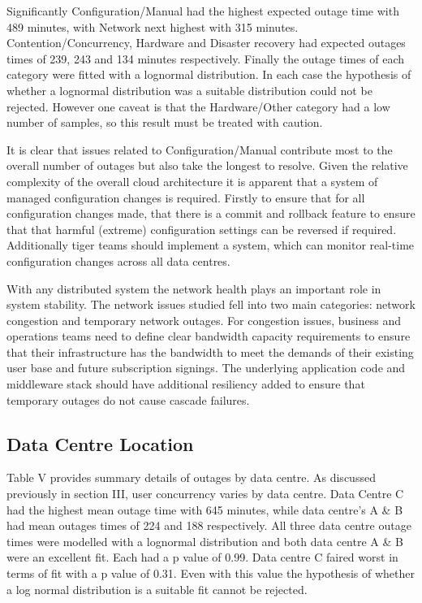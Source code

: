 Significantly Configuration/Manual had the highest expected outage time with 489 minutes, with Network next highest with 315 minutes. Contention/Concurrency, Hardware and Disaster recovery had expected outages times of 239, 243 and 134 minutes respectively. Finally the outage times of each category were fitted with a lognormal distribution. In each case the hypothesis of whether a lognormal distribution was a suitable distribution could not be rejected. However one caveat is that the Hardware/Other category had a low number of samples, so this result must be treated with caution. \par

It is clear that issues related to Configuration/Manual contribute most to the overall number of outages but also take the longest to resolve.  Given the relative complexity of the overall cloud architecture it is apparent that a system of managed configuration changes is required. Firstly to ensure that for all configuration changes made, that there is a commit and rollback feature to ensure that that harmful (extreme) configuration settings can be reversed if required. Additionally tiger teams should implement a system, which can monitor real-time configuration changes across all data centres.  \par

With any distributed system the network health plays an important role in system stability. The network issues studied fell into two main categories: network congestion and temporary network outages. For congestion issues, business and operations teams need to define clear bandwidth capacity requirements to ensure that their infrastructure has the bandwidth to meet the demands of their existing user base and future subscription signings. The underlying application code and middleware stack should have additional resiliency added to ensure that temporary outages do not cause cascade failures.  \par

\subsection{Data Centre Location}

Table V provides summary details of outages by data centre. As discussed previously in section III, user concurrency varies by data centre. Data Centre C had the highest mean outage time with 645 minutes, while data centre's A \& B had mean outages times of 224 and 188 respectively. All three data centre outage times were modelled with a lognormal distribution and both data centre A \& B were an excellent fit. Each had a  p value of 0.99. Data centre C faired worst in terms of fit with a p value of 0.31. Even with this value the hypothesis of whether a log normal distribution is a suitable fit cannot be rejected. \par

